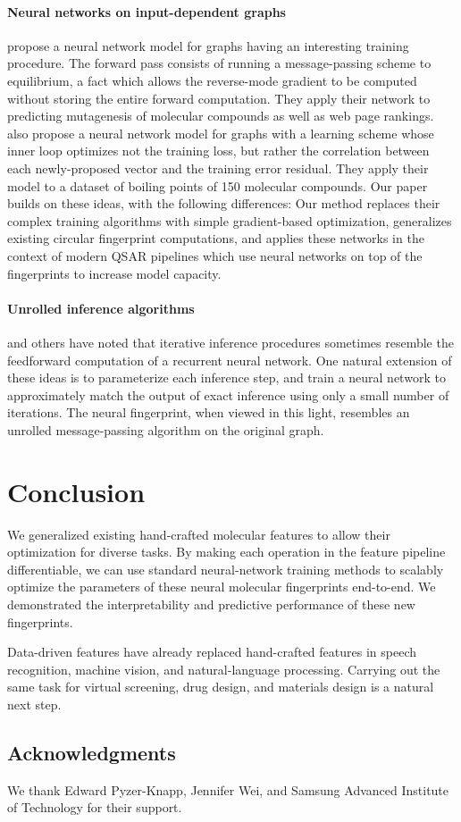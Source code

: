 \documentclass{article}
\newcommand{\citet}{\cite}
\begin{document}
\paragraph{Neural networks on input-dependent graphs}
\cite{graphnn2009} propose a neural network model for graphs having an interesting training procedure.
The forward pass consists of running a message-passing scheme to equilibrium, a fact which allows the reverse-mode gradient to be computed without storing the entire forward computation.
They apply their network to predicting mutagenesis of molecular compounds as well as web page rankings.
\cite{micheli2009neural} also propose a neural network model for graphs with a learning scheme whose inner loop optimizes not the training loss, but rather the correlation between each newly-proposed vector and the training error residual.
They apply their model to a dataset of boiling points of 150 molecular compounds.
Our paper builds on these ideas, with the following differences:
Our method replaces their complex training algorithms with simple gradient-based optimization, generalizes existing circular fingerprint computations, and applies these networks in the context of modern QSAR pipelines which use neural networks on top of the fingerprints to increase model capacity.

\paragraph{Unrolled inference algorithms}
\citet{hershey2014deep} and others have noted that iterative inference procedures sometimes resemble the feedforward computation of a recurrent neural network.
One natural extension of these ideas is to parameterize each inference step, and train a neural network to approximately match the output of exact inference using only a small number of iterations.
The neural fingerprint, when viewed in this light, resembles an unrolled message-passing algorithm on the original graph.


\section{Conclusion}
We generalized existing hand-crafted molecular features to allow their optimization for diverse tasks.
By making each operation in the feature pipeline differentiable, we can use standard neural-network training methods to scalably optimize the parameters of these neural molecular fingerprints end-to-end.
We demonstrated the interpretability and predictive performance of these new fingerprints.

Data-driven features have already replaced hand-crafted features in speech recognition, machine vision, and natural-language processing.
Carrying out the same task for virtual screening, drug design, and materials design is a natural next step.

\subsection*{Acknowledgments}
We thank Edward Pyzer-Knapp, Jennifer Wei, and Samsung Advanced Institute of Technology for their support.



\end{document}
